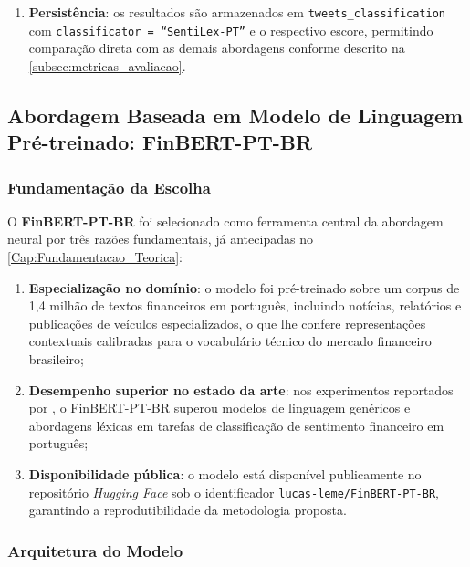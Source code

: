 \begin{enumerate}
	\item \textbf{Persistência}: os resultados são armazenados em \texttt{tweets\_classification} com \texttt{classificator = ``SentiLex-PT''} e o respectivo escore, permitindo comparação direta com as demais abordagens conforme descrito na \autoref{subsec:metricas_avaliacao}.
\end{enumerate}


\subsection{Abordagem Baseada em Modelo de Linguagem Pré-treinado: FinBERT-PT-BR}
\label{subsec:finbert}

\subsubsection{Fundamentação da Escolha}
\label{subsubsec:justificativa_finbert}

O \textbf{FinBERT-PT-BR} \cite{santos2023finbert} foi selecionado como ferramenta central da abordagem neural por três razões fundamentais, já antecipadas no \autoref{Cap:Fundamentacao_Teorica}:

\begin{enumerate}
	\item \textbf{Especialização no domínio}: o modelo foi pré-treinado sobre um corpus de 1,4 milhão de textos financeiros em português, incluindo notícias, relatórios e publicações de veículos especializados, o que lhe confere representações contextuais calibradas para o vocabulário técnico do mercado financeiro brasileiro;
	
	\item \textbf{Desempenho superior no estado da arte}: nos experimentos reportados por , o FinBERT-PT-BR superou modelos de linguagem genéricos e abordagens léxicas em tarefas de classificação de sentimento financeiro em português;
	
	\item \textbf{Disponibilidade pública}: o modelo está disponível publicamente no repositório \textit{Hugging Face} sob o identificador \texttt{lucas-leme/FinBERT-PT-BR}, garantindo a reprodutibilidade da metodologia proposta.
\end{enumerate}

\subsubsection{Arquitetura do Modelo}
\label{subsubsec:arquitetura_finbert}

